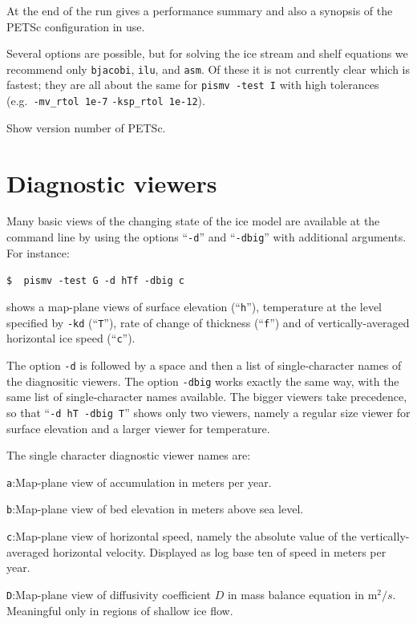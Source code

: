 \documentclass[12pt,final]{amsart}
\renewcommand{\t}[1]{\texttt{#1}}
\begin{document}
  At the end of the run gives a performance summary and also a synopsis of the PETSc configuration in use.

   Several options are possible, but for solving the ice stream and shelf equations we recommend only \t{bjacobi}, \t{ilu}, and \t{asm}.  Of these it is not currently clear which is fastest; they are all about the same for \verb|pismv -test I| with high tolerances (e.g.~\verb|-mv_rtol 1e-7| \verb|-ksp_rtol 1e-12|).

   Show version number of PETSc.


\clearpage \newpage
\section{Diagnostic viewers}\label{sect:viewers}

Many basic views of the changing state of the ice model are available at the command line by using the options ``\t{-d}'' and ``\t{-dbig}'' with additional arguments.  For instance:

\verb|$  pismv -test G -d hTf -dbig c|

\noindent shows a map-plane views of surface elevation (``\t{h}''), temperature at the level specified by \t{-kd} (``\t{T}''), rate of change of thickness (``\t{f}'') and of vertically-averaged horizontal ice speed (``\t{c}'').

The option \t{-d} is followed by a space and then a list of single-character names of the diagnositic viewers.  The option \t{-dbig} works exactly the same way, with the same list of single-character names available.  The bigger viewers take precedence, so that ``\t{-d hT -dbig T}'' shows only two viewers, namely a regular size viewer for surface elevation and a larger viewer for temperature.

The single character diagnostic viewer names are:

\verb|a|:\quad Map-plane view of accumulation in meters per year.

\verb|b|:\quad Map-plane view of bed elevation in meters above sea level.

\verb|c|:\quad Map-plane view of horizontal speed, namely the absolute value of the vertically-averaged horizontal velocity.  Displayed as log base ten of speed in meters per year.

\verb|D|:\quad Map-plane view of diffusivity coefficient $D$ in mass balance equation in $\text{m}^2/s$.  Meaningful only in regions of shallow ice flow.
\end{document}

